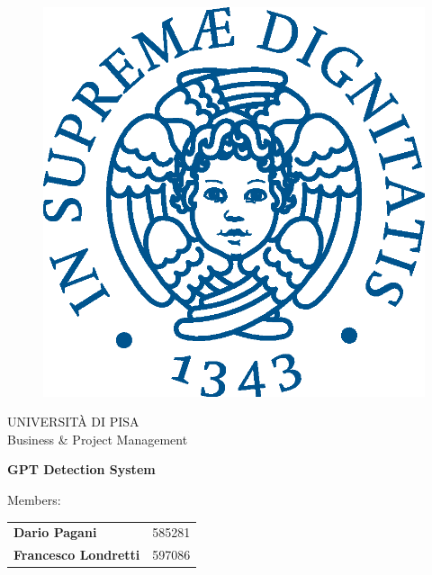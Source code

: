 \begin{titlepage}
    \begin{figure}[!htb]
        \centering
        \includegraphics[keepaspectratio=true,scale=0.5]{images/Frontpage/cherubinFrontespizio.eps}
    \end{figure}
    
    \begin{center}
        \LARGE{UNIVERSITÀ DI PISA}
        \vspace{5mm}
        \\ \LARGE{Business \& Project Management}
    \end{center}
    
    \vspace{15mm}
    \begin{center}
        {\LARGE{\bf GPT Detection System }}
        
        
    \end{center}
    \vspace{30mm}
    
    \begin{minipage}[t]{0.47\textwidth}
        {\large{Members: \vspace{5mm}}{

        	\begin{tabular}{lr}
        		\vspace{3mm} \bf Dario Pagani & 585281 \\
        		\bf Francesco Londretti & 597086
        	\end{tabular}
            }}
    \end{minipage}
    \hfill
    
    \vspace{30mm}
    \hrulefill
    
    \end{titlepage}